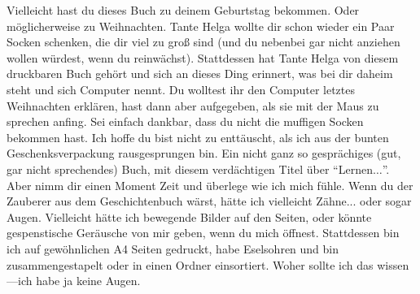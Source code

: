 Vielleicht hast du dieses Buch zu deinem Geburtstag bekommen. Oder möglicherweise zu Weihnachten. Tante Helga wollte dir schon wieder ein Paar Socken schenken, die dir viel zu groß sind (und du nebenbei gar nicht anziehen wollen würdest, wenn du reinwächst). Stattdessen hat Tante Helga von diesem druckbaren Buch gehört und sich an dieses Ding erinnert, was bei dir daheim steht und sich Computer nennt. Du wolltest ihr den Computer letztes Weihnachten erklären, hast dann aber aufgegeben, als sie mit der Maus zu sprechen anfing. Sei einfach dankbar, dass du nicht die muffigen Socken bekommen hast.
Ich hoffe du bist nicht zu enttäuscht, als ich aus der bunten Geschenksverpackung rausgesprungen bin. Ein nicht ganz so gesprächiges (gut, gar nicht sprechendes) Buch, mit diesem verdächtigen Titel über ``Lernen$\ldots$''.
Aber nimm dir einen Moment Zeit und überlege wie ich mich fühle. Wenn du der Zauberer aus dem Geschichtenbuch wärst, hätte ich vielleicht Zähne... oder sogar Augen. Vielleicht hätte ich bewegende Bilder auf den Seiten, oder könnte gespenstische Geräusche von mir geben, wenn du mich öffnest. Stattdessen bin ich auf gewöhnlichen A4 Seiten gedruckt, habe Eselsohren und bin zusammengestapelt oder in einen Ordner einsortiert. Woher sollte ich das wissen---ich habe ja keine Augen.
\\
\\
